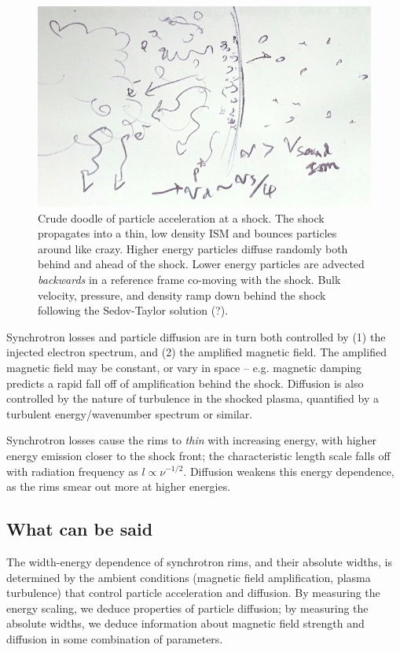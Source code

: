 \documentclass[10pt]{article}
\begin{document}
\begin{figure}[!ht]
  \centering
  \includegraphics[scale=0.3]{doodle.jpg}
  \caption{Crude doodle of particle acceleration at a shock.
  The shock propagates into a thin, low density ISM and bounces particles
  around like crazy.  Higher energy particles diffuse randomly both behind
  and ahead of the shock.  Lower energy particles are advected \emph{backwards}
  in a reference frame co-moving with the shock. Bulk velocity, pressure, and
  density ramp down behind the shock following the Sedov-Taylor solution (?).}
  \label{fig:shock}
\end{figure}

Synchrotron losses and particle diffusion are in turn both controlled by
(1) the injected electron spectrum, and (2) the amplified magnetic field.
The amplified magnetic field may be constant, or vary in space -- e.g.
magnetic damping predicts a rapid fall off of amplification behind the shock.
Diffusion is also controlled by the nature of turbulence in the shocked plasma,
quantified by a turbulent energy/wavenumber spectrum or similar.

Synchrotron losses cause the rims to \emph{thin} with increasing energy, with
higher energy emission closer to the shock front; the characteristic length
scale falls off with radiation frequency as $l \propto \nu^{-1/2}$.  Diffusion
weakens this energy dependence, as the rims smear out more at higher energies.

\subsection{What can be said}

The width-energy dependence of synchrotron rims, and their absolute widths,
is determined by the ambient conditions (magnetic field amplification, plasma
turbulence) that control particle acceleration and diffusion.  By measuring the
energy scaling, we deduce properties of particle diffusion; by measuring the
absolute widths, we deduce information about magnetic field strength
and diffusion in some combination of parameters.
\end{document}
